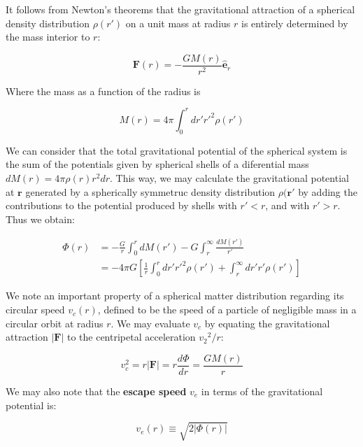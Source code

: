 It follows from Newton's theorems that the gravitational attraction of a spherical density distribution $\rho(r')$ on a unit mass at radius $r$ is entirely determined by the mass interior to $r$:

\begin{equation}
\textbf{F}(r)=-\frac{GM(r)}{r^{2}}\hat{\textbf{e}}_{r}
\end{equation}

Where the mass as a function of the radius is

\begin{equation}
M(r)=4\pi\int_{0}^{r}dr'r'^{2}\rho(r')
\end{equation}

We can consider that the total gravitational potential of the spherical system is the sum of the potentials given by spherical shells of a diferential mass $dM(r)=4\pi\rho(r)r^{2}dr$. This way, we may calculate the gravitational potential at $\textbf{r}$ generated by a spherically symmetruc density distribution $\rho(\textbf{r}'$ by adding the contributions to the potential produced by shells with $r'<r$, and with $r'>r$. Thus we obtain:

\begin{equation}
	\begin{aligned}	
	\Phi(r) &= -\frac{G}{r}\int_{0}^{r}dM(r')-G\int_{r}^{\infty}\frac{dM(r')} {r'}\\      &= -4\pi G\left[\frac{1}{r}\int_{0}^{r}dr'r'^{2}\rho(r')+\int_{r}^{\infty}dr'r'\rho(r')\right]
	\end{aligned}
\end{equation} 

We note an important property of a spherical matter distribution regarding its circular speed $v_{c}(r)$, defined to be the speed of a particle of negligible mass in a circular orbit at radius $r$. We may evaluate $v_{c}$ by equating the gravitational attraction $|\textbf{F}|$  to the centripetal acceleration ${v_{2}}^{2}/r$:

\begin{equation}
v_{c}^{2}=r|\textbf{F}|=r\frac{d\Phi}{dr}=\frac{GM(r)}{r}
\end{equation}

We may also note that the \textbf{escape speed} $v_{e}$ in terms of the gravitational potential is:

\begin{equation}
v_{e}(r)\equiv\sqrt{2|\Phi(r)|}
\end{equation}

